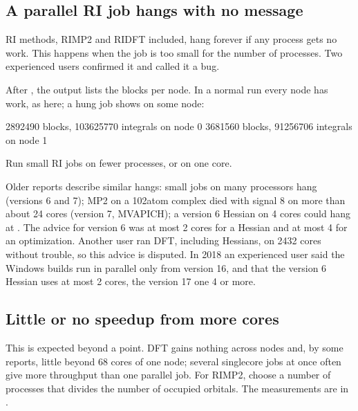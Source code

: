 \documentclass[letterpaper,10pt,english,openany,oneside]{sphinxmanual}
\begin{document}
\subsection{A parallel RI job hangs with no message}
\label{\detokenize{troubleshooting/common-problems:a-parallel-ri-job-hangs-with-no-message}}
\sphinxAtStartPar
{} RI methods, RI\sphinxhyphen{}MP2 and RI\sphinxhyphen{}DFT included, hang forever if any process gets no work. This happens when the job
is too small for the number of processes. Two experienced users confirmed it and called it a bug.

\sphinxAtStartPar
{} After , the output lists the blocks per node. In a normal run every node
has work, as here; a hung job shows  on some node:

\begin{sphinxVerbatim}[commandchars=\\\{\}]
    2892490 blocks,    103625770 integrals on node  0
    3681560 blocks,     91256706 integrals on node  1
\end{sphinxVerbatim}

\sphinxAtStartPar
{} Run small RI jobs on fewer processes, or on one core.



\sphinxAtStartPar
Older reports describe similar hangs: small jobs on many processors hang (versions 6 and 7); MP2 on a 102\sphinxhyphen{}atom complex died with
signal 8 on more than about 24 cores (version 7, MVAPICH); a version 6 Hessian on 4 cores could hang at .
The advice for version 6 was at most 2 cores for a Hessian and at most 4 for an optimization. Another user ran DFT, including
Hessians, on 24\textendash{}32 cores without trouble, so this advice is disputed. In 2018 an experienced user said the Windows
builds run in parallel only from version 16, and that the version 6 Hessian uses at most 2 cores, the version 17 one 4 or more.




\subsection{Little or no speed\sphinxhyphen{}up from more cores}
\label{\detokenize{troubleshooting/common-problems:little-or-no-speed-up-from-more-cores}}
\sphinxAtStartPar
This is expected beyond a point. DFT gains nothing across nodes and, by some reports, little beyond 6\textendash{}8 cores of one
node; several single\sphinxhyphen{}core jobs at once often give more throughput than one parallel job. For RI\sphinxhyphen{}MP2, choose a number
of processes that divides the number of occupied orbitals. The measurements are in {\hyperref[\detokenize{start/parallel:running-parallel-scaling}]{}}.
\end{document}
